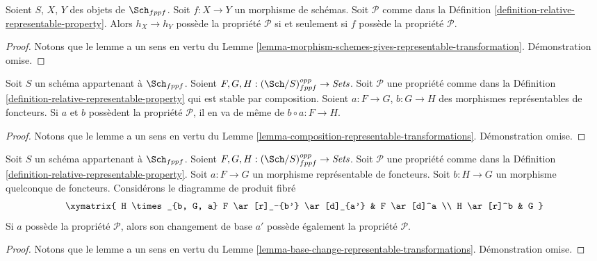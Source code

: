 \begin{lemma}
\label{lemma-morphism-schemes-gives-representable-transformation-property}
Soient $S$, $X$, $Y$ des objets de $\Sch_{fppf}$.
Soit $f : X \to Y$ un morphisme de schémas.
Soit $\mathcal{P}$ comme dans la
Définition \ref{definition-relative-representable-property}.
Alors $h_X \longrightarrow h_Y$ possède la propriété $\mathcal{P}$ si
et seulement si $f$ possède la propriété $\mathcal{P}$.
\end{lemma}

\begin{proof}
Notons que le lemme a un sens en vertu du
Lemme \ref{lemma-morphism-schemes-gives-representable-transformation}.
Démonstration omise.
\end{proof}

\begin{lemma}
\label{lemma-composition-representable-transformations-property}
Soit $S$ un schéma appartenant à $\Sch_{fppf}$.
Soient $F, G, H : (\Sch/S)_{fppf}^{opp} \to \textit{Sets}$.
Soit $\mathcal{P}$ une propriété comme dans la
Définition \ref{definition-relative-representable-property}
qui est stable par composition.
Soient $a : F \to G$, $b : G \to H$ des morphismes représentables de foncteurs.
Si $a$ et $b$ possèdent la propriété $\mathcal{P}$, il en va de même de
$b \circ a : F \longrightarrow H$.
\end{lemma}

\begin{proof}
Notons que le lemme a un sens en vertu du
Lemme \ref{lemma-composition-representable-transformations}.
Démonstration omise.
\end{proof}

\begin{lemma}
\label{lemma-base-change-representable-transformations-property}
Soit $S$ un schéma appartenant à $\Sch_{fppf}$.
Soient $F, G, H : (\Sch/S)_{fppf}^{opp} \to \textit{Sets}$.
Soit $\mathcal{P}$ une propriété comme dans la
Définition \ref{definition-relative-representable-property}.
Soit $a : F \to G$ un morphisme représentable de foncteurs.
Soit $b : H \to G$ un morphisme quelconque de foncteurs.
Considérons le diagramme de produit fibré
$$
\xymatrix{
H \times_{b, G, a} F \ar[r]_-{b'} \ar[d]_{a'} & F \ar[d]^a \\
H \ar[r]^b & G
}
$$
Si $a$ possède la propriété $\mathcal{P}$, alors son changement de base $a'$
possède également la propriété $\mathcal{P}$.
\end{lemma}

\begin{proof}
Notons que le lemme a un sens en vertu du
Lemme \ref{lemma-base-change-representable-transformations}.
Démonstration omise.
\end{proof}


